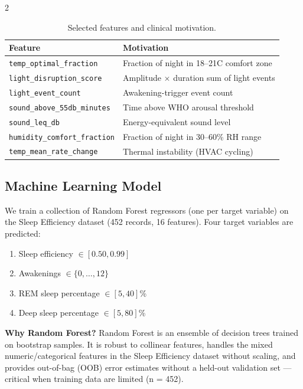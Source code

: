 \documentclass[11pt,a4paper]{article}
\begin{document}
\begin{multicols}{2}
\begin{table}[t]
  \centering
  \small
  \caption{Selected features and clinical motivation.}
  \label{tab:features}
  \begin{tabular}{@{}lp{4.5cm}@{}}
    \toprule
    \textbf{Feature} & \textbf{Motivation} \\
    \midrule
    \texttt{temp\_optimal\_fraction} & Fraction of night in 18–21\textdegree{}C comfort zone \cite{okamoto2012thermal} \\
    \texttt{light\_disruption\_score} & Amplitude $\times$ duration sum of light events \cite{zeitzer2000sensitivity} \\
    \texttt{light\_event\_count} & Awakening-trigger event count \\
    \texttt{sound\_above\_55db\_minutes} & Time above WHO arousal threshold \cite{who2009noise} \\
    \texttt{sound\_leq\_db} & Energy-equivalent sound level \\
    \texttt{humidity\_comfort\_fraction} & Fraction of night in 30–60\% RH range \cite{nuckton2006} \\
    \texttt{temp\_mean\_rate\_change} & Thermal instability (HVAC cycling) \\
    \bottomrule
  \end{tabular}
\end{table}

\subsection{Machine Learning Model}
\label{sec:ml}

We train a collection of Random Forest regressors (one per target variable) on
the Sleep Efficiency dataset \cite{kaggle_sleep_efficiency} (452 records, 16
features).  Four target variables are predicted:
\begin{enumerate}\setlength\itemsep{0pt}
  \item Sleep efficiency $\in [0.50, 0.99]$
  \item Awakenings $\in \{0, \ldots, 12\}$
  \item REM sleep percentage $\in [5, 40]$\%
  \item Deep sleep percentage $\in [5, 80]$\%
\end{enumerate}

\textbf{Why Random Forest?}
Random Forest is an ensemble of decision trees trained on bootstrap samples.
It is robust to collinear features, handles the mixed numeric/categorical
features in the Sleep Efficiency dataset without scaling, and provides
out-of-bag (OOB) error estimates without a held-out validation set — critical
when training data are limited (n = 452).


\end{multicols}
\end{document}
